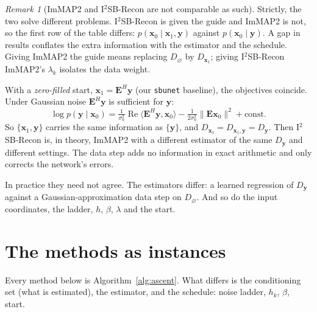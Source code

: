 \documentclass[11pt]{article}
\theoremstyle{remark}
\newtheorem{remark}{Remark}
\newcommand{\x}{\bm{x}}
\newcommand{\y}{\bm{y}}
\newcommand{\Op}{\bm{E}}
\newcommand{\code}[1]{\texttt{#1}}
\newcommand{\Dz}{D_{\varnothing}}
\newcommand{\Dg}{D_{\x_1}}
\newcommand{\Dy}{D_{\y}}
\newcommand{\Dgy}{D_{\x_1,\y}}
\begin{document}
\begin{remark}[ImMAP2 and I$^2$SB-Recon are not comparable as such]
Strictly, the two solve different problems. I$^2$SB-Recon is given the guide and ImMAP2 is not,
so the first row of the table differs: $p(\x_0\mid\x_1,\y)$ against $p(\x_0\mid\y)$. A gap in
results conflates the extra information with the estimator and the schedule. Giving ImMAP2 the
guide means replacing $\Dz$ by $\Dg$; giving I$^2$SB-Recon ImMAP2's $\lambda_k$ isolates the
data weight.

With a \emph{zero-filled} start, $\x_1 = \Op^H\y$ (our \code{sbunet} baseline), the objectives
coincide. Under Gaussian noise $\Op^H\y$ is sufficient for $\y$:
\[
  \log p(\y\mid\x_0) = \tfrac{1}{\sigma_n^2}\operatorname{Re}\langle\Op^H\y,\x_0\rangle
  - \tfrac{1}{2\sigma_n^2}\|\Op\x_0\|^2 + \mathrm{const}.
\]
So $\{\x_1,\y\}$ carries the same information as $\{\y\}$, and $\Dg = \Dgy = \Dy$. Then
I$^2$SB-Recon is, in theory, ImMAP2 with a different estimator of the same $\Dy$ and different
settings. The data step adds no information in exact arithmetic and only corrects the network's
errors.

In practice they need not agree. The estimators differ: a learned regression of $\Dy$ against a
Gaussian-approximation data step on $\Dz$. And so do the input coordinates, the ladder, $h$,
$\beta$, $\lambda$ and the start.
\end{remark}

\section{The methods as instances}

Every method below is Algorithm~\ref{alg:ascent}. What differs is the conditioning set (what is
estimated), the estimator, and the schedule: noise ladder, $h_k$, $\beta$, start.
\end{document}
